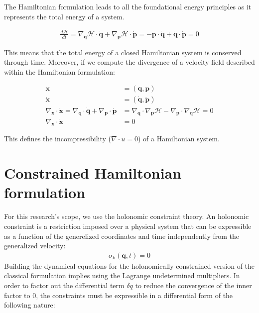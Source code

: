 \documentclass[draft]{agujournal2019}
\begin{document}
\begin{definition}
    The Hamiltonian formulation leads to all the foundational energy principles as it represents the total energy of a system.

\begin{align*}
    \frac{d\mathcal{H}}{dt} = \nabla_\mathbf{q} \mathcal{H} \cdot \dot{\mathbf{q}} + \nabla_\mathbf{p} \mathcal{H} \cdot \dot{\mathbf{p}} = - \mathbf{p} \cdot \dot{\mathbf{q}} + \dot{\mathbf{q}} \cdot \dot{\mathbf{p}} = 0
\end{align*}

This means that the total energy of a closed Hamiltonian system is conserved through time.
Moreover, if we compute the divergence of a velocity field described within the Hamiltonian formulation:

\begin{align*}
    \mathbf{x} &= (\mathbf{q}, \mathbf{p}) \\
    \dot{\mathbf{x}} &= (\dot{\mathbf{q}}, \dot{\mathbf{p}}) \\
    \nabla_\mathbf{x} \cdot \dot{\mathbf{x}} = \nabla_\mathbf{q} \cdot \dot{\mathbf{q}} + \nabla_\mathbf{p} \cdot \dot{\mathbf{p}} &= \nabla_\mathbf{q} \cdot \nabla_\mathbf{p} \mathcal{H} - \nabla_\mathbf{p} \cdot \nabla_\mathbf{q} \mathcal{H} = 0 \\
    \nabla_\mathbf{x} \cdot \dot{\mathbf{x}} &= 0
\end{align*}

This defines the incompressibility ($\nabla \cdot u = 0$) of a Hamiltonian system.


\section{Constrained Hamiltonian formulation}

For this research's scope, we use the holonomic constraint theory. An holonomic constraint is a restriction imposed over a physical system that can be expressible as a function of the generelized coordinates and time independently from the generalized velocity:
\begin{align*}
    \sigma_k \left( \mathbf{q}, t \right) = 0
\end{align*}
Building the dynamical equations for the holonomically constrained version of the classical formulation implies using the Lagrange undetermined multipliers. In order to factor out the differential term $\delta q$ to reduce the convergence of the inner factor to $0$, the constraints must be expressible in a differential form of the following nature:


\end{definition}
\end{document}
